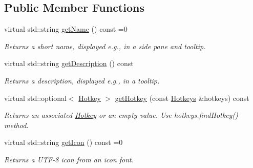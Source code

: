 \subsection*{Public Member Functions}
\begin{DoxyCompactItemize}
\item 
\mbox{\label{classpepr3d_1_1_tool_a5706faac1c122203317c60b3eb231d1a}} 
virtual std\+::string \mbox{\hyperlink{classpepr3d_1_1_tool_a5706faac1c122203317c60b3eb231d1a}{get\+Name}} () const =0
\begin{DoxyCompactList}\small\item\em Returns a short name, displayed e.\+g., in a side pane and tooltip. \end{DoxyCompactList}\item 
\mbox{\label{classpepr3d_1_1_tool_a331bbb48707ea07c472b7634b02e1a18}} 
virtual std\+::string \mbox{\hyperlink{classpepr3d_1_1_tool_a331bbb48707ea07c472b7634b02e1a18}{get\+Description}} () const
\begin{DoxyCompactList}\small\item\em Returns a description, displayed e.\+g., in a tooltip. \end{DoxyCompactList}\item 
\mbox{\label{classpepr3d_1_1_tool_a2b3b7279f6a942a99c11c9495b3a3d84}} 
virtual std\+::optional$<$ \mbox{\hyperlink{structpepr3d_1_1_hotkey}{Hotkey}} $>$ \mbox{\hyperlink{classpepr3d_1_1_tool_a2b3b7279f6a942a99c11c9495b3a3d84}{get\+Hotkey}} (const \mbox{\hyperlink{classpepr3d_1_1_hotkeys}{Hotkeys}} \&hotkeys) const
\begin{DoxyCompactList}\small\item\em Returns an associated \mbox{\hyperlink{structpepr3d_1_1_hotkey}{Hotkey}} or an empty value. Use hotkeys.\+find\+Hotkey() method. \end{DoxyCompactList}\item 
\mbox{\label{classpepr3d_1_1_tool_a068b3420aff7edd507e3348c6d83c383}} 
virtual std\+::string \mbox{\hyperlink{classpepr3d_1_1_tool_a068b3420aff7edd507e3348c6d83c383}{get\+Icon}} () const =0
\begin{DoxyCompactList}\small\item\em Returns a U\+T\+F-\/8 icon from an icon font. \end{DoxyCompactList}\item 

\end{DoxyCompactItemize}
